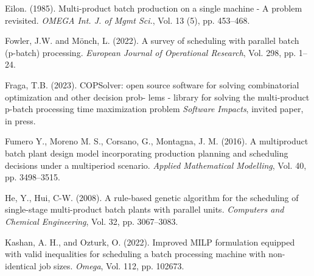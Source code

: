 \documentclass[authoryear,manuscript,12pt]{elsarticle}
\begin{document}




\begin{thebibliography}{1}


Eilon. (1985). Multi-product batch production on a single machine - A problem revisited. {\it OMEGA Int. J. of Mgmt Sci.}, Vol. 13 (5), pp. 453--468.

Fowler, J.W. and Mönch, L. (2022). A survey of scheduling with parallel batch (p-batch) processing. {\it European Journal of Operational Research}, Vol. 298, pp. 1--24.

Fraga, T.B. (2023). COPSolver: open source software for solving combinatorial optimization and other decision prob-
lems - library for solving the multi-product p-batch processing time maximization problem {\it Software Impacts}, invited paper, in press.

Fumero Y., Moreno M. S., Corsano, G., Montagna, J. M. (2016). A multiproduct batch plant design model incorporating production planning and scheduling decisions under a multiperiod scenario. {\it Applied Mathematical Modelling}, Vol. 40, pp. 3498--3515.

He, Y., Hui, C-W. (2008). A rule-based genetic algorithm for the scheduling of single-stage multi-product batch plants with parallel units. {\it  Computers and Chemical Engineering}, Vol. 32, pp. 3067--3083.

Kashan, A. H., and Ozturk, O. (2022). Improved MILP formulation equipped with valid inequalities for scheduling a batch processing machine with non-identical job sizes. {\it  Omega}, Vol. 112, pp. 102673.


\end{thebibliography}
\end{document}
